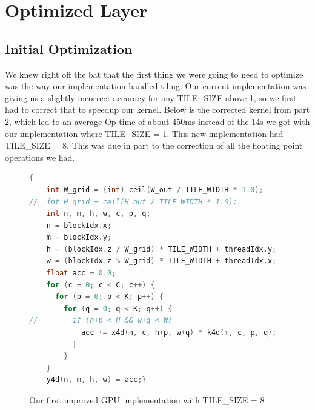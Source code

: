 \documentclass[titlepage]{article}
\begin{document}
\newpage

\section*{Optimized Layer}

\subsection*{Initial Optimization}
We knew right off the bat that the first thing we were going to need to optimize was the way our implementation handled tiling. Our current implementation was giving us a slightly incorrect accuracy for any TILE\_SIZE above 1, so we first had to correct that to speedup our kernel. Below is the corrected kernel from part 2, which led to an average Op time of about 450ms instead of the 14s we got with our implementation where TILE\_SIZE = 1. This new implementation had TILE\_SIZE = 8. This was due in part to the correction of all the floating point operations we had.


\begin{figure}[h!]
\begin{lstlisting}[language=C++]
{
    int W_grid = (int) ceil(W_out / TILE_WIDTH * 1.0);
//  int H_grid = ceil(H_out / TILE_WIDTH * 1.0);
    int n, m, h, w, c, p, q;
    n = blockIdx.x;
    m = blockIdx.y;
    h = (blockIdx.z / W_grid) * TILE_WIDTH + threadIdx.y;
    w = (blockIdx.z % W_grid) * TILE_WIDTH + threadIdx.x;
    float acc = 0.0;
    for (c = 0; c < C; c++) {
      for (p = 0; p < K; p++) {
        for (q = 0; q < K; q++) {
//        if (h+p < H && w+q < W)
            acc += x4d(n, c, h+p, w+q) * k4d(m, c, p, q);
          }
        }
    }
    y4d(n, m, h, w) = acc;}
\end{lstlisting}
\caption{Our first improved GPU implementation with TILE\_SIZE = 8}
\end{figure}

\newpage
\end{document}
